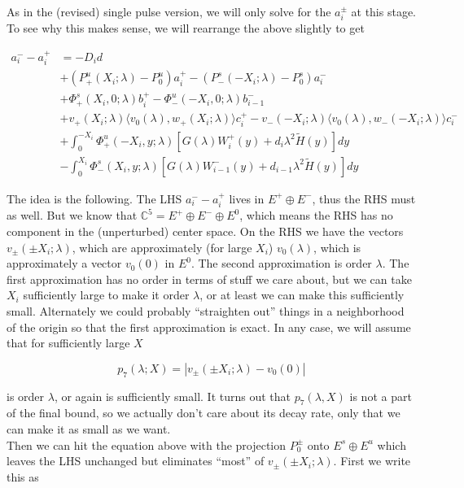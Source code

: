 \documentclass[12pt]{article}
\def\C{{\mathbb C}}
\begin{document}
\begin{enumerate}
As in the (revised) single pulse version, we will only solve for the $a_i^\pm$ at this stage. To see why this makes sense, we will rearrange the above slightly to get

\begin{align*}
a_i^- - a_i^+ &= -D_i d  \\
&+ (P^u_+(X_i; \lambda) - P_0^u)a_i^+ - (P^s_-(-X_i; \lambda) - P_0^s)a_i^- \\
&+ \Phi^s_+(X_i, 0; \lambda)b_i^+ - \Phi^u_-(-X_i, 0; \lambda)b_{i-1}^- \\
&+ v_+(X_i; \lambda) \langle v_0(\lambda), w_+(X_i; \lambda) \rangle c_i^+ - v_-(-X_i; \lambda) \langle v_0(\lambda), w_-(-X_i; \lambda) \rangle c_i^- \\
&+ \int_0^{-X_i} \Phi^u_+(-X_i, y; \lambda) [ G(\lambda)W_i^+(y) + d_i \lambda^2 \tilde{H}(y) ] dy \\
&- \int_0^{X_i} \Phi^s_-(X_i, y; \lambda) [ G(\lambda)W_{i-1}^-(y) + d_{i-1} \lambda^2 \tilde{H}(y) ] dy
\end{align*}

The idea is the following. The LHS $a_i^- - a_i^+$ lives in $E^+ \oplus E^-$, thus the RHS must as well. But we know that $\C^5 = E^+ \oplus E^- \oplus E^0$, which means the RHS has no component in the (unperturbed) center space. On the RHS we have the vectors $v_\pm(\pm X_i; \lambda)$, which are approximately (for large $X_i$) $v_0(\lambda)$, which is approximately a vector $v_0(0)$ in $E^0$. The second approximation is order $\lambda$. The first approximation has no order in terms of stuff we care about, but we can take $X_i$ sufficiently large to make it order $\lambda$, or at least we can make this sufficiently small. Alternately we could probably ``straighten out'' things in a neighborhood of the origin so that the first approximation is exact. In any case, we will assume that for sufficiently large $X$

\[
p_7(\lambda; X) = |v_\pm(\pm X_i; \lambda) - v_0(0)| 
\]

is order $\lambda$, or again is sufficiently small. It turns out that $p_7(\lambda, X)$ is not a part of the final bound, so we actually don't care about its decay rate, only that we can make it as small as we want.\\

Then we can hit the equation above with the projection $P_0^\pm$ onto $E^s \oplus E^u$ which leaves the LHS unchanged but eliminates ``most'' of $v_\pm(\pm X_i; \lambda)$. First we write this as


\end{enumerate}
\end{document}
